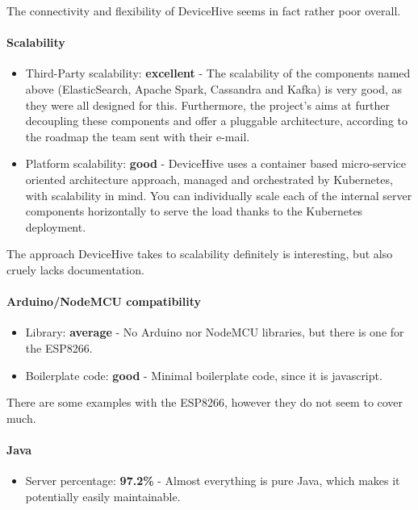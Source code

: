 \documentclass{article}
\begin{document}
The connectivity and flexibility of DeviceHive seems in fact rather poor overall.

\paragraph{Scalability}

\begin{itemize}
\item Third-Party scalability: \textbf{excellent} - The scalability of the components named above (ElasticSearch, Apache Spark, Cassandra and Kafka) is very good, as they were all designed for this. Furthermore, the project's aims at further decoupling these components and offer a pluggable architecture, according to the roadmap the team sent with their e-mail.
\item Platform scalability: \textbf{good} - DeviceHive uses a container based micro-service oriented architecture approach, managed and orchestrated by Kubernetes, with scalability in mind. You can individually scale each of the internal server components horizontally to serve the load thanks to the Kubernetes deployment.
\end{itemize}

The approach DeviceHive takes to scalability definitely is interesting, but also cruely lacks documentation.

\paragraph{Arduino/NodeMCU compatibility}

\begin{itemize}
\item Library: \textbf{average} - No Arduino nor NodeMCU libraries, but there is one for the ESP8266.
\item Boilerplate code: \textbf{good} - Minimal boilerplate code, since it is javascript.
\end{itemize}

There are some examples with the ESP8266, however they do not seem to cover much.

\paragraph{Java}

\begin{itemize}
\item Server percentage: \textbf{97.2\%} - Almost everything is pure Java, which makes it potentially easily maintainable.
\end{itemize}
\end{document}
